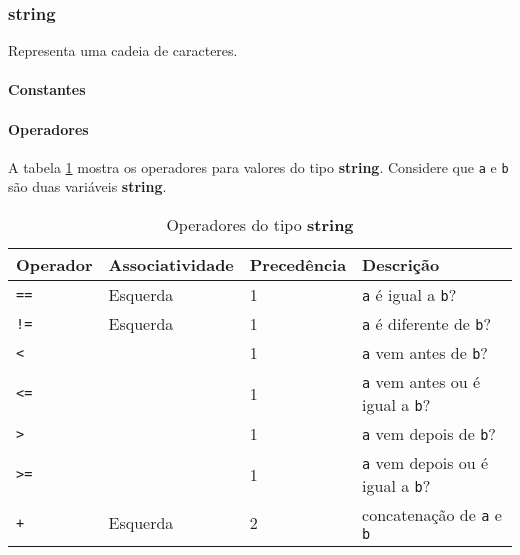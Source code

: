 \subsubsection{string}
Representa uma cadeia de caracteres.

\paragraph{Constantes}

\paragraph{Operadores} A tabela \ref{tab:operadores-string} mostra os operadores para valores do tipo \textbf{string}. Considere que \texttt{a} e \texttt{b} são duas variáveis \textbf{string}.
\begin{table}[!h]
    \begin{tabular}{@{}llll@{}}
        \toprule
        Operador                 & Associatividade & Precedência & Descrição                                      \\ \midrule
        \texttt{==}              & Esquerda        & 1           & \texttt{a} é igual a \texttt{b}?               \\
        \texttt{!=}              & Esquerda        & 1           & \texttt{a} é diferente de \texttt{b}?          \\
        \texttt{\textless{}}     &                 & 1           & \texttt{a} vem antes de \texttt{b}?            \\
        \texttt{\textless{}=}    &                 & 1           & \texttt{a} vem antes ou é igual a \texttt{b}?  \\
        \texttt{\textgreater{}}  &                 & 1           & \texttt{a} vem depois de \texttt{b}?           \\
        \texttt{\textgreater{}=} &                 & 1           & \texttt{a} vem depois ou é igual a \texttt{b}? \\
        \texttt{+}               & Esquerda        & 2           & concatenação de \texttt{a} e \texttt{b}        \\
    \end{tabular}
    \caption{Operadores do tipo \textbf{string}}
    \label{tab:operadores-string}
\end{table}

